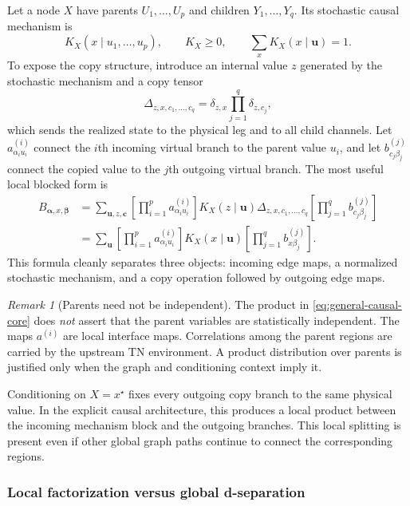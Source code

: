 \documentclass[11pt]{article}
\theoremstyle{remark}
\newtheorem{remark}[definition]{Remark}
\begin{document}
Let a node $X$ have parents $U_1,\ldots,U_p$ and children $Y_1,\ldots,Y_q$. Its stochastic causal mechanism is
\begin{equation}
K_X(x\mid u_1,\ldots,u_p),\qquad K_X\ge0,\qquad \sum_xK_X(x\mid\bm u)=1.
\end{equation}
To expose the copy structure, introduce an internal value $z$ generated by the stochastic mechanism and a copy tensor
\begin{equation}
\Delta_{z,x,c_1,\ldots,c_q}=\delta_{z,x}\prod_{j=1}^q\delta_{z,c_j},
\end{equation}
which sends the realized state to the physical leg and to all child channels. Let $a^{(i)}_{\alpha_i u_i}$ connect the $i$th incoming virtual branch to the parent value $u_i$, and let $b^{(j)}_{c_j\beta_j}$ connect the copied value to the $j$th outgoing virtual branch. The most useful local blocked form is
\begin{align}
B_{\bm\alpha,x,\bm\beta}
&=
\sum_{\bm u,z,\bm c}
\left[\prod_{i=1}^p a^{(i)}_{\alpha_i u_i}\right]
K_X(z\mid\bm u)
\Delta_{z,x,c_1,\ldots,c_q}
\left[\prod_{j=1}^q b^{(j)}_{c_j\beta_j}\right]\nonumber\\
&=
\sum_{\bm u}
\left[\prod_{i=1}^p a^{(i)}_{\alpha_i u_i}\right]
K_X(x\mid\bm u)
\left[\prod_{j=1}^q b^{(j)}_{x\beta_j}\right].
\label{eq:general-causal-core}
\end{align}
This formula cleanly separates three objects: incoming edge maps, a normalized stochastic mechanism, and a copy operation followed by outgoing edge maps.

\begin{remark}[Parents need not be independent]
The product in \cref{eq:general-causal-core} does \emph{not} assert that the parent variables are statistically independent. The maps $a^{(i)}$ are local interface maps. Correlations among the parent regions are carried by the upstream TN environment. A product distribution over parents is justified only when the graph and conditioning context imply it.
\end{remark}

Conditioning on $X=x^\star$ fixes every outgoing copy branch to the same physical value. In the explicit causal architecture, this produces a local product between the incoming mechanism block and the outgoing branches. This local splitting is present even if other global graph paths continue to connect the corresponding regions.

\subsubsection{Local factorization versus global d-separation}
\end{document}
